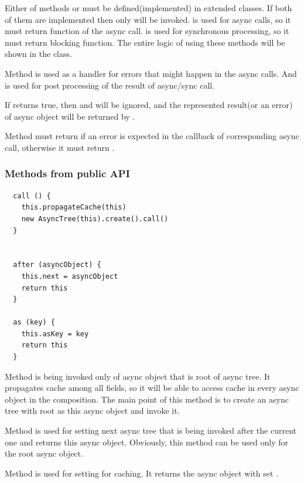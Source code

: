 \documentclass{article}
\begin{document}
Either of methods  or  must be defined(implemented) in extended classes. If both of them are implemented then only  will be invoked.  is used for async calls, so it must return function of the async call.  is used for synchronous processing, so it must return blocking function. The entire logic of using these methods will be shown in the  class. 

Method  is used as a handler for errors that might happen in the async calls. And  is used for post processing of the result of async/sync call.

If  returns true, then  and  will be ignored, and the represented result(or an error) of async object will be returned by .

Method  must return  if an error is expected in the callback of corresponding async call, otherwise it must return .

\vspace*{10px}

\subsubsection{Methods from public API}

\begin{verbatim}
  call () {
    this.propagateCache(this)
    new AsyncTree(this).create().call()
  }


  after (asyncObject) {
    this.next = asyncObject
    return this
  }

  as (key) {
    this.asKey = key
    return this
  }
\end{verbatim}

Method  is being invoked only of async object that is root of async tree. It propagates cache among all fields, so it will be able to access cache in every async object in the composition. The main point of this method is to create an async tree with root as this async object and invoke it.

Method  is used for setting next async tree that is being invoked after the current one and returns this async object. Obviously, this method can be used only for the root async object.

Method  is used for setting  for caching. It returns the async object with set .
\end{document}
